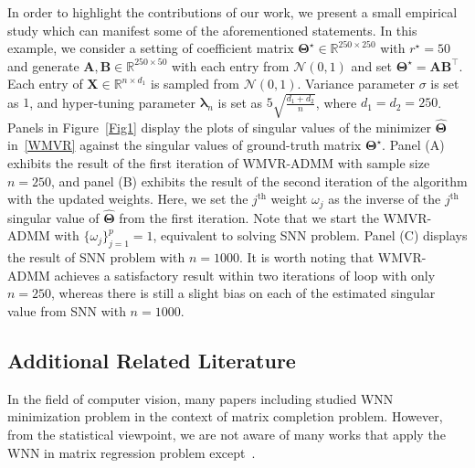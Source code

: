\documentclass[alpha-refs]{wiley-article}
\begin{document}
In order to highlight the contributions of our work, we present a small empirical study which can manifest some of the aforementioned statements.
In this example, we consider a setting of coefficient matrix $\boldsymbol{\Theta}^{\star}\in\mathbb{R}^{250 \times 250}$ with $r^{\star}=50$ and generate $\boldsymbol{A}, \boldsymbol{B} \in \mathbb{R}^{250 \times 50}$ with each entry from $\mathcal{N}(0,1)$ and set $\boldsymbol{\Theta}^{\star}=\boldsymbol{AB^{\top}}$.
Each entry of $\boldsymbol{X}\in\mathbb{R}^{n \times d_{1}}$ is sampled from $\mathcal{N}(0,1)$.
Variance parameter $\sigma$ is set as $1$, and hyper-tuning parameter $\boldsymbol{\lambda}_{n}$ is set as $5\sqrt{\frac{d_{1}+d_{2}}{n}}$, where $d_{1}=d_{2}=250$.
Panels in Figure~\ref{Fig1} display the plots of singular values of the minimizer $\widehat{\boldsymbol{\Theta}}$ in~\eqref{WMVR} against the singular values of ground-truth matrix $\boldsymbol{\Theta^{\star}}$.
Panel (A) exhibits the result of the first iteration of WMVR-ADMM with sample size $n=250$, and panel (B) exhibits the result of the second iteration of the algorithm with the updated weights.
Here, we set the $j^{\text{th}}$ weight $\omega_{j}$ as the inverse of the $j^{\text{th}}$ singular value of $\widehat{\boldsymbol{\Theta}}$ from the first iteration.
Note that we start the WMVR-ADMM with $\{\omega_{j}\}_{j=1}^{p}=1$, equivalent to solving SNN problem.
Panel (C) displays the result of SNN problem with $n=1000$.
It is worth noting that WMVR-ADMM achieves a satisfactory result within two iterations of loop with only $n=250$, whereas there is still a slight bias on each of the estimated singular value from SNN with $n=1000$.

\subsection{Additional Related Literature}
In the field of computer vision, many papers including \citet{gu2014weighted,gu2017weighted,xu2017multi,yair2018multi,liu2018speckle,kim2020cauchy} studied WNN minimization problem in the context of matrix completion problem.
However, from the statistical viewpoint, we are not aware of many works that apply the WNN in matrix regression problem except~\citet{chen2013reduced}.
\end{document}

